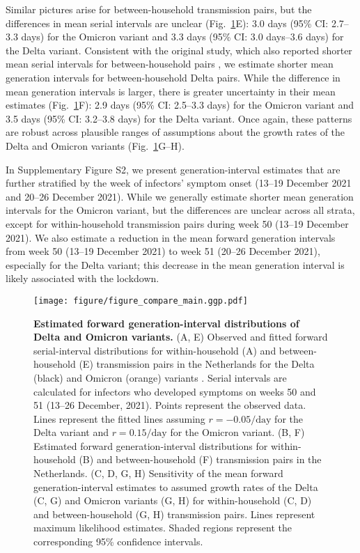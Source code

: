 \documentclass[12pt]{article}
\newcommand{\fref}[1]{Fig.~\ref{fig:#1}}
\begin{document}
Similar pictures arise for between-household transmission pairs, but the differences in mean serial intervals are unclear (\fref{serial}E): 3.0 days (95\% CI: 2.7--3.3 days) for the Omicron variant and 3.3 days (95\% CI: 3.0 days--3.6 days) for the Delta variant.
Consistent with the original study, which also reported shorter mean serial intervals for between-household pairs \citep{backer2021omicron}, we estimate shorter mean generation intervals for between-household Delta pairs.
While the difference in mean generation intervals is larger, there is greater uncertainty in their mean estimates (\fref{serial}F): 2.9 days (95\% CI: 2.5--3.3 days) for the Omicron variant and 3.5 days (95\% CI: 3.2--3.8 days) for the Delta variant.
Once again, these patterns are robust across plausible ranges of assumptions about the growth rates of the Delta and Omicron variants (\fref{serial}G--H).

In Supplementary Figure S2, we present generation-interval estimates that are further stratified by the week of infectors' symptom onset (13--19 December 2021 and 20--26 December 2021).
While we generally estimate shorter mean generation intervals for the Omicron variant, but the differences are unclear across all strata, except for within-household transmission pairs during week 50 (13--19 December 2021).
We also estimate a reduction in the mean forward generation intervals from week 50 (13--19 December 2021) to week 51 (20--26 December 2021), especially for the Delta variant;
this decrease in the mean generation interval is likely associated with the lockdown.

\begin{figure}[!th]
\texttt{[image: figure/figure\_compare\_main.ggp.pdf]}
\caption{
\textbf{Estimated forward generation-interval distributions of Delta and Omicron variants.}
(A, E) Observed and fitted forward serial-interval distributions for within-household (A) and between-household (E) transmission pairs in the Netherlands for the Delta (black) and Omicron (orange) variants \citep{backer2021omicron}.
Serial intervals are calculated for infectors who developed symptoms on weeks 50 and 51 (13--26 December, 2021).
Points represent the observed data.
Lines represent the fitted lines assuming $r=-0.05/\textrm{day}$ for the Delta variant and $r=0.15/\textrm{day}$ for the Omicron variant.
(B, F) Estimated forward generation-interval distributions for within-household (B) and between-household (F) transmission pairs in the Netherlands.
(C, D, G, H) Sensitivity of the mean forward generation-interval estimates to assumed growth rates of the Delta (C, G) and Omicron variants (G, H) for within-household (C, D) and between-household (G, H) transmission pairs.
Lines represent maximum likelihood estimates.
Shaded regions represent the corresponding 95\% confidence intervals.
\label{fig:serial}
}
\end{figure}
\end{document}
